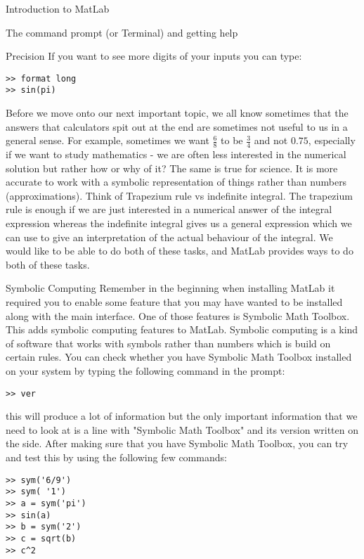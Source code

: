 \documentclass[11pt, oneside]{report}   	%
\begin{document}
\begin{chapter}{Introduction to MatLab}
\begin{section}{The command prompt (or Terminal) and getting help}
\begin{subsection}{Precision}
If you want to see more digits of your inputs you can type:
\begin{lstlisting}
>> format long
>> sin(pi)
\end{lstlisting}

\end{subsection}

Before we move onto our next important topic, we all know sometimes that the answers that calculators spit out at the end are sometimes not useful to us in a general sense. For example, sometimes we want $\frac{6}{8}$ to be $\frac{3}{4}$ and not $0.75$, especially if we want to study mathematics - we are often less interested in the numerical solution but rather how or why of it? The same is true for science. It is more accurate to work with a symbolic representation of things rather than numbers (approximations). Think of Trapezium rule vs indefinite integral. The trapezium rule is enough if we are just interested in a numerical answer of the integral expression whereas the indefinite integral gives us a general expression which we can use to give an interpretation of the actual behaviour of the integral. We would like to be able to do both of these tasks, and MatLab provides ways to do both of these tasks.

\begin{subsection}{Symbolic Computing}
Remember in the beginning when installing MatLab it required you to enable some feature that you may have wanted to be installed along with the main interface. One of those features is Symbolic Math Toolbox. This adds symbolic computing features to MatLab. Symbolic computing is a kind of software that works with symbols rather than numbers which is build on certain rules. 
You can check whether you have Symbolic Math Toolbox installed on your system by typing the following command in the prompt:

\begin{lstlisting}
>> ver
\end{lstlisting}
this will produce a lot of information but the only important information that we need to look at is a line with "Symbolic Math Toolbox" and its version written on the side.
After making sure that you have Symbolic Math Toolbox, you can try and test this by using the following few commands:

\begin{lstlisting}
>> sym('6/9')
>> sym( '1')
>> a = sym('pi')
>> sin(a)
>> b = sym('2')
>> c = sqrt(b)
>> c^2
\end{lstlisting}


\end{subsection}
\end{section}
\end{chapter}
\end{document}
